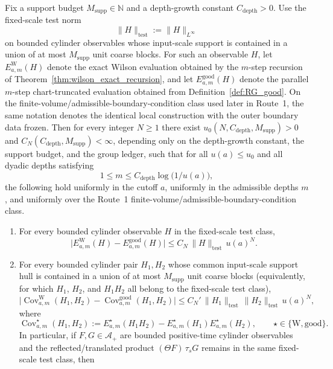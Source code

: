 \begin{theorem}\label{thm:Wilson_patch_transport}
Fix a support budget $M_{\mathrm{supp}}\in\mathbb N$ and a depth-growth constant $C_{\mathrm{depth}}>0$.
Use the fixed-scale test norm
\[
\|H\|_{\mathrm{test}}:=\|H\|_{L^\infty}
\]
on bounded cylinder observables whose input-scale support is contained in a union of at most $M_{\mathrm{supp}}$ unit coarse blocks.
For such an observable $H$, let $E_{a,m}^{\mathrm W}(H)$ denote the exact Wilson evaluation obtained by the $m$-step recursion of Theorem~\ref{thm:wilson_exact_recursion}, and let $E_{a,m}^{\mathrm{good}}(H)$ denote the parallel $m$-step chart-truncated evaluation obtained from Definition~\ref{def:RG_good}.
On the finite-volume/admissible-boundary-condition class used later in Route~1, the same notation denotes the identical local construction with the outer boundary data frozen.
Then for every integer $N\ge 1$ there exist $u_0(N,C_{\mathrm{depth}},M_{\mathrm{supp}})>0$ and $C_N(C_{\mathrm{depth}},M_{\mathrm{supp}})<\infty$, depending only on the depth-growth constant, the support budget, and the group ledger, such that for all $u(a)\le u_0$ and all dyadic depths satisfying
\[
1\le m\le C_{\mathrm{depth}}\log\!\bigl(1/u(a)\bigr),
\]
the following hold uniformly in the cutoff $a$, uniformly in the admissible depths $m$, and uniformly over the Route~1 finite-volume/admissible-boundary-condition class.
\begin{enumerate}[label=\textup{(\alph*)}]
\item For every bounded cylinder observable $H$ in the fixed-scale test class,
\[
\big|E_{a,m}^{\mathrm W}(H)-E_{a,m}^{\mathrm{good}}(H)\big|
\le C_N\,\|H\|_{\mathrm{test}}\,u(a)^N.
\]
\item For every bounded cylinder pair $H_1,H_2$ whose common input-scale support hull is contained in a union of at most $M_{\mathrm{supp}}$ unit coarse blocks (equivalently, for which $H_1$, $H_2$, and $H_1H_2$ all belong to the fixed-scale test class),
\[
\big|\operatorname{Cov}_{a,m}^{\mathrm W}(H_1,H_2)-\operatorname{Cov}_{a,m}^{\mathrm{good}}(H_1,H_2)\big|
\le C_N'\,\|H_1\|_{\mathrm{test}}\,\|H_2\|_{\mathrm{test}}\,u(a)^N,
\]
where
\[
\operatorname{Cov}_{a,m}^{\star}(H_1,H_2):=E_{a,m}^{\star}(H_1H_2)-E_{a,m}^{\star}(H_1)E_{a,m}^{\star}(H_2),\qquad \star\in\{\mathrm W,\mathrm{good}\}.
\]
In particular, if $F,G\in\mathcal A_+$ are bounded positive-time cylinder observables and the reflected/translated product $(\Theta F)\,\tau_s G$ remains in the same fixed-scale test class, then

\end{enumerate}
\end{theorem}
